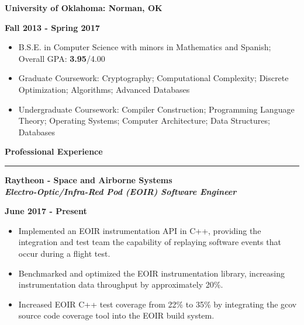 \documentclass[10pt,letterpaper]{article}
\begin{document}
\begin{minipage}[t]{0.5\textwidth}
	\begin{flushleft}
		\textbf{University of Oklahoma: Norman, OK}\\
				
	\end{flushleft}
\end{minipage}
\begin{minipage}[t]{0.47\textwidth}
	\begin{flushright}
		\textbf{Fall 2013 - Spring 2017}
				
	\end{flushright}
\end{minipage}
\begin{itemize}[topsep=0pt]
	\setlength\itemsep{-0.10em}
	\item B.S.E. in Computer Science with minors in Mathematics and Spanish; Overall GPA: \textbf{3.95}/{4.00}
	\item Graduate Coursework: Cryptography; Computational Complexity; Discrete Optimization;
	      Algorithms; Advanced Databases
	\item Undergraduate Coursework: Compiler Construction; Programming Language Theory;
	      Operating Systems; Computer Architecture; Data Structures; Databases
\end{itemize}

\medskip

\begin{large}
	\textbf{Professional Experience}
\end{large}

\smallskip \hrule \smallskip

\begin{minipage}[t]{0.53\textwidth}
	\begin{flushleft}
		\textbf{Raytheon - Space and Airborne Systems}\\
		\textbf{\textit{Electro-Optic/Infra-Red Pod (EOIR) Software Engineer}}\\
	\end{flushleft}
\end{minipage}
\begin{minipage}[t]{0.44\textwidth}
	\begin{flushright}
		\textbf{June 2017 - Present}
	\end{flushright}
\end{minipage}

\begin{itemize}[noitemsep,topsep=0pt]
	\setlength\itemsep{-0.10em}
	\item Implemented an EOIR instrumentation API in C++, providing the integration
	      and test team the capability of replaying software events that occur during a flight test.
	\item Benchmarked and optimized the EOIR instrumentation library, increasing instrumentation
	      data throughput by approximately 20\%.
	\item Increased EOIR C++ test coverage from 22\% to 35\% by integrating the gcov source code
	      coverage tool into the EOIR build system.
\end{itemize}
\end{document}
